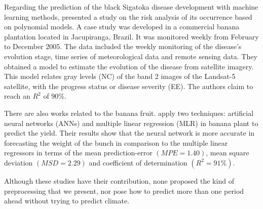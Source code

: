 Regarding the prediction of the black Sigatoka disease development
with machine learning methods, \citet{Bendini2013} presented a study
on the risk analysis of its occurrence based on polynomial models.
%
A case study was developed in a commercial banana plantation located
in Jacupiranga, Brazil. It was monitored weekly from February to
December 2005.
%
The data included the weekly monitoring of the disease’s evolution
stage, time series of meteorological data and remote sensing
data.
%
They obtained a model to estimate the evolution of the disease from
satellite imagery. This model relates gray levels (NC) of the band 2
images of the Landsat-5 satellite, with the progress status or disease
severity (EE). The authors claim to reach an $R^2$ of 90\%.

There are also works related to the banana fruit. \citet{Soares2014}
apply two techniques: artificial neural networks (ANNs) and multiple
linear regression (MLR) in banana plant to predict the yield.
%
Their results show that the neural network is more accurate in
forecasting the weight of the bunch in comparison to the multiple
linear regressors in terms of the mean prediction-error $(MPE =
1.40)$, mean square deviation $(MSD = 2.29)$ and coefficient of
determination $(R^2 = 91\%)$.

Although these studies have their contribution, none proposed the kind of preprocessing that we present, nor pose how to predict more than one period ahead without trying to predict climate.

%

